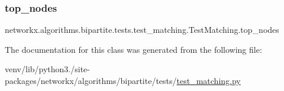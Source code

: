 \subsubsection{\texorpdfstring{top\+\_\+nodes}{top\_nodes}}
{\footnotesize\ttfamily networkx.\+algorithms.\+bipartite.\+tests.\+test\+\_\+matching.\+Test\+Matching.\+top\+\_\+nodes}



The documentation for this class was generated from the following file\+:\begin{DoxyCompactItemize}
\item 
venv/lib/python3./site-\/packages/networkx/algorithms/bipartite/tests/\hyperlink{bipartite_2tests_2test__matching_8py}{test\+\_\+matching.\+py}\end{DoxyCompactItemize}
